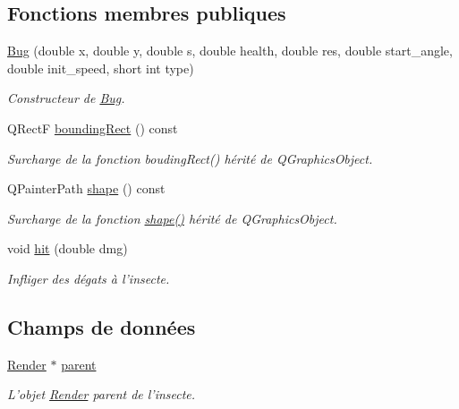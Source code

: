 \subsection*{Fonctions membres publiques}
\begin{DoxyCompactItemize}
\item 
\hyperlink{classBug_a1d3140d50abd44257d5e0b1b6dcb4514}{Bug} (double x, double y, double s, double health, double res, double start\_\-angle, double init\_\-speed, short int type)
\begin{DoxyCompactList}\small\item\em Constructeur de \hyperlink{classBug}{Bug}. \end{DoxyCompactList}\item 
QRectF \hyperlink{classBug_a9b39c25361faad07b1bf2dd927d09dab}{boundingRect} () const 
\begin{DoxyCompactList}\small\item\em Surcharge de la fonction boudingRect() hérité de QGraphicsObject. \end{DoxyCompactList}\item 
QPainterPath \hyperlink{classBug_a587a36d3145c2b4dba6c689af22c65ac}{shape} () const 
\begin{DoxyCompactList}\small\item\em Surcharge de la fonction \hyperlink{classBug_a587a36d3145c2b4dba6c689af22c65ac}{shape()} hérité de QGraphicsObject. \end{DoxyCompactList}\item 
void \hyperlink{classBug_a63402c05b5ba3fb034e41f1ced0e4b9f}{hit} (double dmg)
\begin{DoxyCompactList}\small\item\em Infliger des dégats à l'insecte. \end{DoxyCompactList}\end{DoxyCompactItemize}
\subsection*{Champs de données}
\begin{DoxyCompactItemize}
\item 
\hyperlink{classRender}{Render} $\ast$ \hyperlink{classBug_a7a93aae4e4b7a215c94ff85d0bd6e26d}{parent}
\begin{DoxyCompactList}\small\item\em L'objet \hyperlink{classRender}{Render} parent de l'insecte. \end{DoxyCompactList}\end{DoxyCompactItemize}

